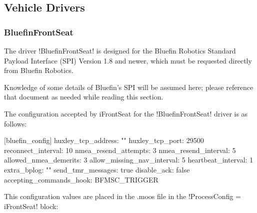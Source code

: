 \subsection{Vehicle Drivers}\label{chap:specific}

\subsubsection{BluefinFrontSeat}\label{sec:bluefin_specific}

The driver !BluefinFrontSeat! is designed for the Bluefin Robotics Standard Payload Interface (SPI) Version 1.8 and newer, which must be requested directly from Bluefin Robotics. 

Knowledge of some details of Bluefin's SPI will be assumed here; please reference that document as needed while reading this section.

The configuration accepted by iFrontSeat for the !BluefinFrontSeat! driver is as follows:

\begin{boxedverbatim}

  [bluefin_config] { 
    huxley_tcp_address: "" 
    huxley_tcp_port: 29500 
    reconnect_interval: 10 
    nmea_resend_attempts: 3 
    nmea_resend_interval: 5 
    allowed_nmea_demerits: 3 
    allow_missing_nav_interval: 5 
    heartbeat_interval: 1  
    extra_bplog: ""  
    send_tmr_messages: true
    disable_ack: false
    accepting_commands_hook: BFMSC_TRIGGER 
  }
\end{boxedverbatim}
\resetbvlinenumber

This configuration values are placed in the .moos file in the !ProcessConfig = iFrontSeat! block:

